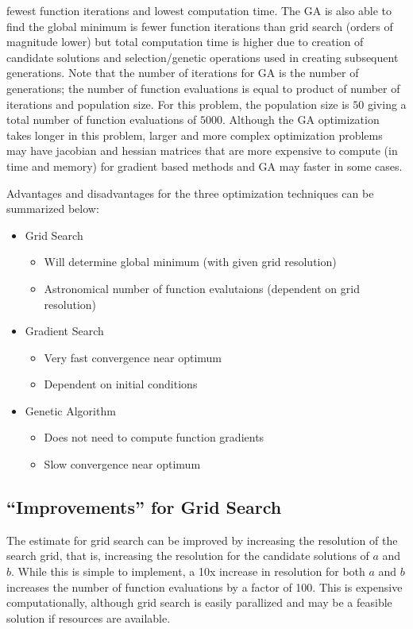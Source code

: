 \documentclass[11pt,a4paper]{article}
\begin{document}
fewest function iterations and lowest computation time. The GA is also able to
find the global minimum is fewer function iterations than grid search (orders
of magnitude lower) but total computation time is higher due to creation of
candidate solutions and selection/genetic operations used in creating
subsequent generations. Note that the number of iterations for GA is the number
of generations; the number of function evaluations is equal to product of
number of iterations and population size. For this problem, the population size
is $50$ giving a total number of function evaluations of $5000$. Although the
GA optimization takes longer in this
problem, larger and more complex optimization problems may have jacobian and
hessian matrices that are more expensive to compute (in time and memory) for
gradient based methods and GA may faster in some cases.

Advantages and disadvantages for the three optimization techniques can be
summarized below:
\begin{itemize}
    \item Grid Search
        \begin{itemize}
            \item Will determine global minimum (with given grid resolution)
            \item Astronomical number of function evalutaions (dependent on
                grid resolution)
        \end{itemize}
    \item Gradient Search
        \begin{itemize}
            \item Very fast convergence near optimum
            \item Dependent on initial conditions
        \end{itemize}
    \item Genetic Algorithm
        \begin{itemize}
            \item Does not need to compute function gradients
            \item Slow convergence near optimum
        \end{itemize}
\end{itemize}

\subsection{``Improvements'' for Grid Search}
The estimate for grid search can be improved by increasing the resolution of
the search grid, that is, increasing the resolution for the candidate solutions
of $a$ and $b$. While this is simple to implement, a 10x increase in resolution
for both $a$ and $b$ increases the number of function evaluations by a factor
of 100. This is expensive computationally, although grid search is easily
parallized and may be a feasible solution if resources are available.
\end{document}
